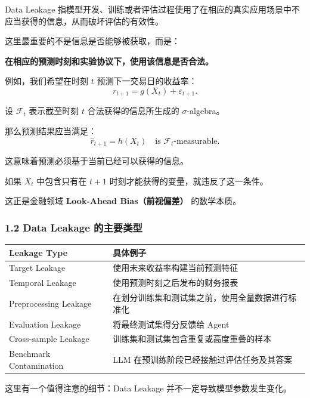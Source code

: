 Data Leakage 指模型开发、训练或者评估过程使用了在相应的真实应用场景中不应当获得的信息，从而破坏评估的有效性。

这里最重要的不是信息是否能够被获取，而是：

\textbf{在相应的预测时刻和实验协议下，使用该信息是否合法。}

例如，我们希望在时刻 \(t\) 预测下一交易日的收益率：
\[r_{t+1}=g(X_t)+\varepsilon_{t+1}.\]

设 \(\mathcal F_t\) 表示截至时刻 \(t\) 合法获得的信息所生成的 \(\sigma\)-algebra。

那么预测结果应当满足：
\[\boxed{
\hat r_{t+1}=h(X_t)
\quad\text{is }\mathcal F_t\text{-measurable}.
}\]

这意味着预测必须基于当前已经可以获得的信息。

如果 \(X_t\) 中包含只有在 \(t+1\) 时刻才能获得的变量，就违反了这一条件。

这正是金融领域 \textbf{Look-Ahead Bias（前视偏差）} 的数学本质。

\hypertarget{part-2-23-0001-data-leakage-ux7684ux4e3bux8981ux7c7bux578b}{%
\subsubsection{1.2 Data Leakage 的主要类型}\label{part-2-23-0001-data-leakage-ux7684ux4e3bux8981ux7c7bux578b}}

\begin{readertable}
\begin{longtable}[]{@{}
  >{\raggedright\arraybackslash}p{}
  >{\raggedright\arraybackslash}p{}@{}}
\toprule
Leakage Type & 具体例子 \\
\midrule
\endhead
Target Leakage & 使用未来收益率构建当前预测特征 \\
Temporal Leakage & 使用预测时刻之后发布的财务报表 \\
Preprocessing Leakage & 在划分训练集和测试集之前，使用全量数据进行标准化 \\
Evaluation Leakage & 将最终测试集得分反馈给 Agent \\
Cross-sample Leakage & 训练集和测试集包含重复或高度重叠的样本 \\
Benchmark Contamination & LLM 在预训练阶段已经接触过评估任务及其答案 \\
\bottomrule
\end{longtable}
\end{readertable}

这里有一个值得注意的细节：Data Leakage 并不一定导致模型参数发生变化。

